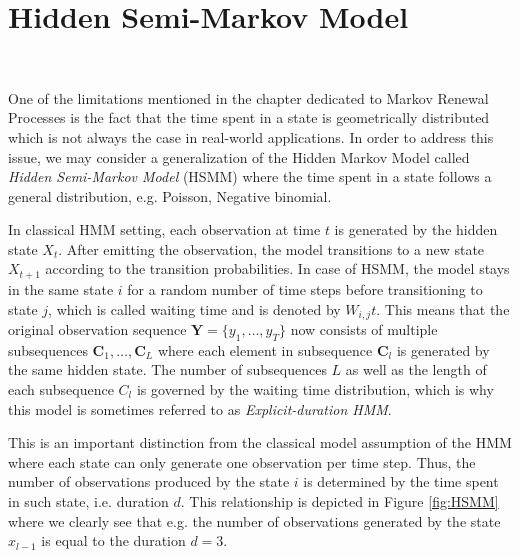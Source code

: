 \section{Hidden Semi-Markov Model}~\label{sec:hsmm}

One of the limitations mentioned in the chapter dedicated to Markov Renewal Processes is the fact that the time spent in a state is geometrically distributed which is not
always the case in real-world applications. In order to address this issue, we may consider a generalization of the Hidden Markov Model called \textit{Hidden Semi-Markov Model} (HSMM) where
the time spent in a state follows a general distribution, e.g. Poisson, Negative binomial. \citep{Yu2015}

In classical HMM setting, each observation at time $t$ is generated by the hidden state $X_t$. After emitting the observation, the model transitions to a new state $X_{t+1}$ according to 
the transition probabilities. In case of HSMM, the model stays in the same state $i$ for a random number of time steps before transitioning to state $j$, which is called waiting time and is denoted by $W_{i,j}t$.
This means that the original observation sequence $\textbf{Y} = \{y_1,\ldots,y_T\}$ now consists of multiple subsequences $\textbf{C}_1,\ldots,\textbf{C}_L$ where each element in subsequence $\textbf{C}_l$ is generated by the same hidden state. \citep{Dasu2011}
The number of subsequences $L$ as well as the length of each subsequence $C_l$ is governed by the waiting time distribution, which is why this model is sometimes referred to as \textit{Explicit-duration HMM}. \citep{Yu2015} 

This is an important distinction from the classical model assumption of the HMM where each state can only generate one observation per time step. Thus, the number of observations produced by the state $i$ is determined by the time spent in such state, i.e. duration $d$. 
This relationship is depicted in Figure \ref{fig:HSMM} where we clearly see that e.g. the number of observations generated by the state $x_{l-1}$ is equal to the duration $d=3$. 



